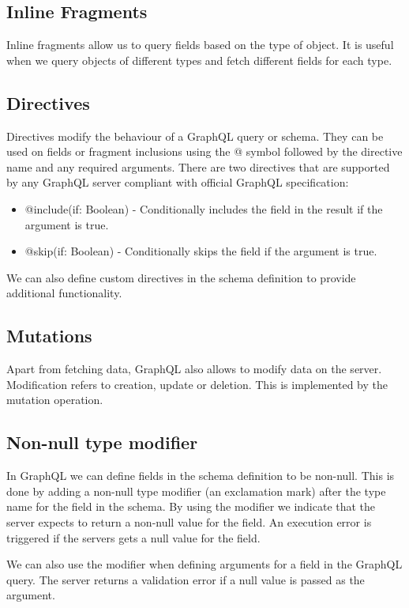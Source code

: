 \subsection*{Inline Fragments}
Inline fragments allow us to query fields based on the type of object. It is useful when we query objects of different types and fetch different fields for each type.

\subsection*{Directives}
Directives modify the behaviour of a GraphQL query or schema. They can be used on fields or fragment inclusions using the @ symbol followed by the directive name and any required arguments. There are two directives that are supported by any GraphQL server compliant with official GraphQL specification:

\begin{itemize}
\item @include(if: Boolean) -  Conditionally includes the field in the result if the argument is true.
\item @skip(if: Boolean) -  Conditionally skips the field if the argument is true.
\end{itemize}

We can also define custom directives in the schema definition to provide additional functionality.

\subsection*{Mutations}
Apart from fetching data, GraphQL also allows to modify data on the server. Modification refers to creation, update or deletion. This is implemented by the mutation operation. 

\subsection*{Non-null type modifier}
In GraphQL we can define fields in the schema definition to be non-null. This is done by adding a non-null type modifier (an exclamation mark) after the type name for the field in the schema. By using the modifier we indicate that the server expects to return a non-null value for the field. An execution error is triggered if the servers gets a null value for the field. 

We can also use the modifier when defining arguments for a field in the GraphQL query. The server returns a validation error if a null value is passed as the argument. 

